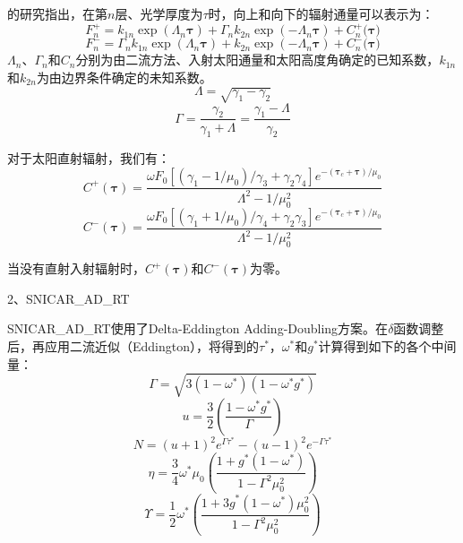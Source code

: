 \citet{meador1980TwostreamApproximationsRadiative}的研究指出，在第$n$层、光学厚度为\(\tau\)时，向上和向下的辐射通量可以表示为：
\begin{equation}
F_{n}^{+} = k_{1n}\exp\left( \Lambda_{n}\mathbf{\tau} \right) + \Gamma_{n}k_{2n}\exp\left( {- \Lambda}_{n}\mathbf{\tau} \right) + C_{n}^{+}(\mathbf{\tau)}
\end{equation}
\begin{equation}
F_{n}^{-} = \Gamma_{n}k_{1n}\exp\left( \Lambda_{n}\mathbf{\tau} \right) + k_{2n}\exp\left( {- \Lambda}_{n}\mathbf{\tau} \right) + C_{n}^{-}(\mathbf{\tau)}
\end{equation}
%
\(\Lambda_{n}\)、\(\Gamma_{n}\)和\(C_{n}\)分别为由二流方法、入射太阳通量和太阳高度角确定的已知系数，\(k_{1n}\)和\(k_{2n}\)为由边界条件确定的未知系数。
\begin{equation}
\Lambda = \sqrt{\gamma_{1} - \gamma_{2}}
\end{equation}
\begin{equation}
\Gamma = \frac{\gamma_{2}}{\gamma_{1} + \Lambda} = \frac{\gamma_{1} - \Lambda}{\gamma_{2}}
\end{equation}

对于太阳直射辐射，我们有：
\begin{equation}
C^{+}(\mathbf{\tau}) = \frac{\omega F_{0}\left\lbrack \left( \gamma_{1} - 1/\mu_{0} \right)/\gamma_{3} + \gamma_{2}\gamma_{4} \right\rbrack e^{- \left( \mathbf{\tau}_{c} + \mathbf{\tau} \right)/\mu_{0}}}{\Lambda^{2} - 1/\mu_{0}^{2}}
\end{equation}
\begin{equation}
C^{-}(\mathbf{\tau}) = \frac{\omega F_{0}\left\lbrack \left( \gamma_{1} + 1/\mu_{0} \right)/\gamma_{4} + \gamma_{2}\gamma_{3} \right\rbrack e^{- \left( \mathbf{\tau}_{c} + \mathbf{\tau} \right)/\mu_{0}}}{\Lambda^{2} - 1/\mu_{0}^{2}}
\end{equation}

当没有直射入射辐射时，\(C^{+}(\mathbf{\tau})\)和\(C^{-}(\mathbf{\tau})\)为零。

2、SNICAR\_AD\_RT

SNICAR\_AD\_RT使用了Delta-Eddington
Adding-Doubling方案。在$\delta$函数调整后，再应用二流近似（Eddington），将得到的$\tau^*$，$\omega^*$和$g^*$计算得到如下的各个中间量：
\begin{equation}
\Gamma = \sqrt{3(1 - \omega^{*})(1 - \omega^{*}g^{*})}
\end{equation}
\begin{equation}
u = \frac{3}{2}\left( \frac{1 - \omega^{*}g^{*}}{\Gamma} \right)
\end{equation}
\begin{equation}
N = {(u + 1)}^{2}e^{\Gamma\tau^{*}} - {(u - 1)}^{2}e^{- \Gamma\tau^{*}}
\end{equation}
\begin{equation}
\eta = \frac{3}{4}\omega^{*}\mu_{0}\left( \frac{1 + g^{*}(1 - \omega^{*})}{1 - \Gamma^{2}\mu_{0}^{2}} \right)
\end{equation}
\begin{equation}
\Upsilon = \frac{1}{2}\omega^{*}\left( \frac{1 + {3g}^{*}(1 - \omega^{*})\mu_{0}^{2}}{1 - \Gamma^{2}\mu_{0}^{2}} \right)
\end{equation}

